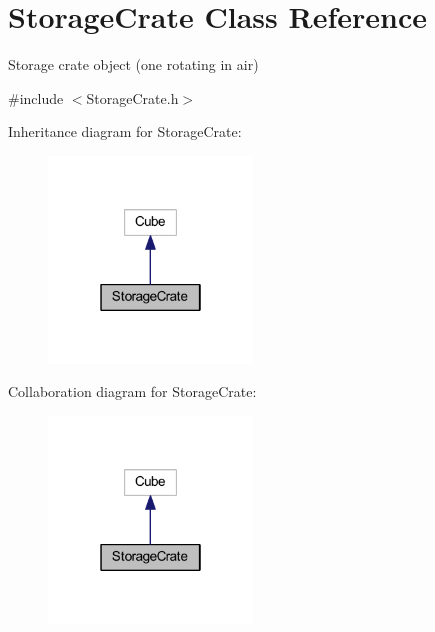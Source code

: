 \hypertarget{class_storage_crate}{}\section{Storage\+Crate Class Reference}
\label{class_storage_crate}


Storage crate object (one rotating in air)  




{\ttfamily \#include $<$Storage\+Crate.\+h$>$}



Inheritance diagram for Storage\+Crate\+:\nopagebreak
\begin{figure}[H]
\begin{center}
\leavevmode
\includegraphics[width=154pt]{class_storage_crate__inherit__graph}
\end{center}
\end{figure}


Collaboration diagram for Storage\+Crate\+:\nopagebreak
\begin{figure}[H]
\begin{center}
\leavevmode
\includegraphics[width=154pt]{class_storage_crate__coll__graph}
\end{center}
\end{figure}
